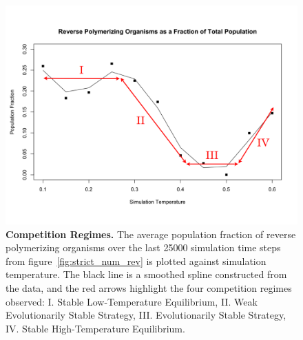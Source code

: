 \begin{figure}[ht]
	\centering
		\includegraphics[width=\textwidth]{competition_regimes}
	\caption{\textbf{Competition Regimes.} The average population fraction of reverse polymerizing organisms over the last 25000 simulation time steps from figure~\ref{fig:strict_num_rev} is plotted against simulation temperature. The black line is a smoothed spline constructed from the data, and the red arrows highlight the four competition regimes observed: I. Stable Low-Temperature Equilibrium, II. Weak Evolutionarily Stable Strategy, III. Evolutionarily Stable Strategy, IV. Stable High-Temperature Equilibrium.}
	\label{fig:competition_regimes}
\end{figure}

